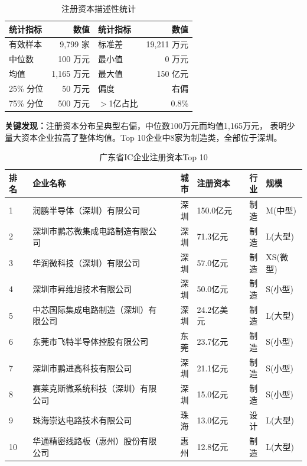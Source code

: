 \documentclass[12pt,a4paper]{ctexart}
\newcommand{\tableHeaderRow}{\rowcolor{tealPrimary}\color{white}}
\newcommand{\tableOddRow}{\rowcolor{mintBG}}
\newcommand{\tableEvenRow}{\rowcolor{white}}
\begin{document}
\begin{table}[H]
\centering
\caption{注册资本描述性统计}
\label{tab:capital_stat}
\begin{tabular}{lrlr}
\toprule
\tableHeaderRow
\textbf{统计指标} & \textbf{数值} & \textbf{统计指标} & \textbf{数值} \\
\midrule
\tableOddRow  有效样本   & 9,799 家  & 标准差       & 19,211 万元 \\
\tableEvenRow 中位数     & 100 万元  & 最小值       & 0 万元      \\
\tableOddRow  均值       & 1,165 万元 & 最大值       & 150 亿元    \\
\tableEvenRow 25\% 分位  & 50 万元   & 偏度         & 右偏        \\
\tableOddRow  75\% 分位  & 500 万元  & $>$1亿占比   & 0.8\%       \\
\bottomrule
\end{tabular}
\end{table}

\textbf{关键发现：}注册资本分布呈典型右偏，中位数100万元而均值1,165万元，
表明少量大资本企业拉高了整体均值。Top 10企业中8家为制造类，全部位于深圳。

\begin{table}[H]
\centering
\caption{广东省IC企业注册资本Top 10}
\label{tab:capital_top10}
\begin{tabular}{llrlrl}
\toprule
\tableHeaderRow
\textbf{排名} & \textbf{企业名称} & \textbf{城市} & \textbf{注册资本} & \textbf{行业} & \textbf{规模} \\
\midrule
\tableOddRow  1  & 润鹏半导体（深圳）有限公司      & 深圳 & 150.0亿元 & 制造 & M(中型) \\
\tableEvenRow 2  & 深圳市鹏芯微集成电路制造有限公司  & 深圳 & 71.3亿元  & 制造 & L(大型) \\
\tableOddRow  3  & 华润微科技（深圳）有限公司       & 深圳 & 57.0亿元  & 制造 & XS(微型) \\
\tableEvenRow 4  & 深圳市昇维旭技术有限公司        & 深圳 & 50.0亿元  & 制造 & S(小型) \\
\tableOddRow  5  & 中芯国际集成电路制造（深圳）有限公司 & 深圳 & 24.2亿美元 & 制造 & L(大型) \\
\tableEvenRow 6  & 东莞市飞特半导体控股有限公司      & 东莞 & 23.7亿元  & 制造 & S(小型) \\
\tableOddRow  7  & 深圳市鹏进高科技有限公司         & 深圳 & 21.1亿元  & 制造 & S(小型) \\
\tableEvenRow 8  & 赛莱克斯微系统科技（深圳）有限公司  & 深圳 & 15.0亿元  & 制造 & S(小型) \\
\tableOddRow  9  & 珠海崇达电路技术有限公司         & 珠海 & 13.0亿元  & 设计 & L(大型) \\
\tableEvenRow 10 & 华通精密线路板（惠州）股份有限公司  & 惠州 & 12.8亿元  & 制造 & L(大型) \\
\bottomrule
\end{tabular}
\end{table}
\end{document}
